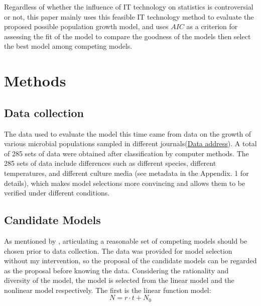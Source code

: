 \documentclass[11pt]{article}
\begin{document}
Regardless of whether the influence of IT technology on statistics is controversial or not, this paper mainly uses this feasible IT technology method to evaluate the proposed possible population growth model, and uses $AIC$ as a criterion for assessing the fit of the model to compare the goodness of the models then select the best model among competing models.


\section{Methods}

\subsection{Data collection}
The data used to evaluate the model this time came from data on the growth of various microbial populations sampled in different journals(\href{https://github.com/mhasoba/TheMulQuaBio/blob/master/content/data/LogisticGrowthData.csv}{Data address}). A total of 285 sets of data were obtained after classification by computer methods. The 285 sets of data include differences such as different species, different temperatures, and different culture media (see metadata in the Appendix. 1 for details), which makes model selections more convincing and allows them to be verified under different conditions.

\subsection{Candidate Models}
As mentioned by \cite{johnson2004model}, articulating a reasonable set of competing models should be chosen prior to data collection. The data was provided for model selection without my intervention, so the proposal of the candidate models can be regarded as the proposal before knowing the data. Considering the rationality and diversity of the model, the model is selected from the linear model and the nonlinear model respectively. The first is the linear function model:
\begin{equation}
    {N}={r}\cdot{t}+{N_0}
\end{equation}
\end{document}
